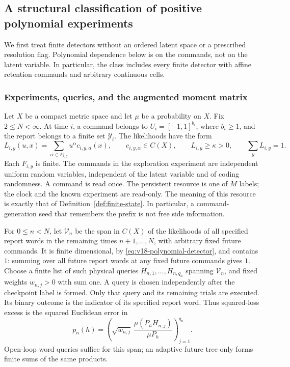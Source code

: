 \subsection{A structural classification of positive polynomial experiments}
\label{sec:v18-structure}
We first treat finite detectors without an ordered latent space or a
prescribed resolution flag. Polynomial dependence below is on the commands,
not on the latent variable. In particular, the class includes every finite
detector with affine retention commands and arbitrary continuous cells.

\subsubsection{Experiments, queries, and the augmented moment matrix}
Let $X$ be a compact metric space and let $\mu$ be a probability on $X$.
Fix $2\le N<\infty$. At time $i$, a command belongs to
$U_i=[-1,1]^{b_i}$, where $b_i\ge1$, and the report belongs to a finite set $\mathcal Y_i$.
The likelihoods have the form
\begin{equation}\label{eq:v18-polynomial-detector}
 L_{i,y}(u,x)=\sum_{\alpha\in F_{i,y}}u^\alpha c_{i,y,\alpha}(x),
 \qquad c_{i,y,\alpha}\in C(X),\qquad
 L_{i,y}\ge\kappa>0,\qquad \sum_yL_{i,y}=1.
\end{equation}
Each $F_{i,y}$ is finite. The commands in the exploration experiment are
independent uniform random variables, independent of the latent variable
and of coding randomness. A command is read once. The persistent resource
is one of $M$ labels; the clock and the known experiment are read-only.
The meaning of this resource is exactly that of
Definition~\ref{def:finite-state}. In particular, a command-generation
seed that remembers the prefix is not free side information.

For $0\le n<N$, let $\mathscr V_n$ be the span in $C(X)$ of the
likelihoods of all specified report words in the remaining times
$n+1,\ldots,N$, with arbitrary fixed future commands. It is finite
dimensional, by \eqref{eq:v18-polynomial-detector}, and contains $1$:
summing over all future report words at any fixed future commands gives
$1$. Choose a finite list of such physical queries
$H_{n,1},\ldots,H_{n,q_n}$ spanning $\mathscr V_n$, and fixed weights
$w_{n,j}>0$ with sum one. A query is chosen independently after the
checkpoint label is formed. Only that query and its remaining trials
are executed. Its binary outcome is the indicator of its specified
report word. Thus squared-loss excess is the squared Euclidean error in
\[
 p_n(h)=\left(\sqrt{w_{n,j}}\,
             \frac{\mu(P_hH_{n,j})}{\mu P_h}\right)_{j=1}^{q_n}.
\]
Open-loop word queries suffice for this span; an adaptive future tree
only forms finite sums of the same products.

